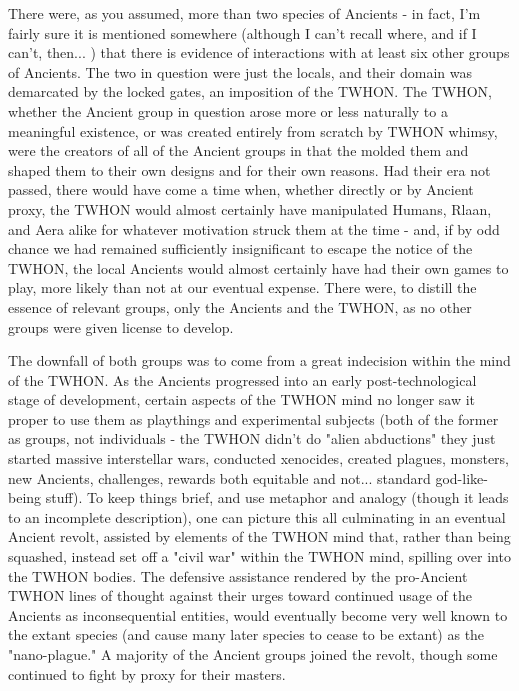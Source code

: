 There were, as you assumed, more than two species of Ancients - in fact, I'm fairly sure it is mentioned somewhere (although I can't recall where, and if I can't, then... ) that there is evidence of interactions with at least six other groups of Ancients. The two in question were just the locals, and their domain was demarcated by the locked gates, an imposition of the TWHON. The TWHON, whether the Ancient group in question arose more or less naturally to a meaningful existence, or was created entirely from scratch by TWHON whimsy, were the creators of all of the Ancient groups in that the molded them and shaped them to their own designs and for their own reasons. Had their era not passed, there would have come a time when, whether directly or by Ancient proxy, the TWHON would almost certainly have manipulated Humans, Rlaan, and Aera alike for whatever motivation struck them at the time - and, if by odd chance we had remained sufficiently insignificant to escape the notice of the TWHON, the local Ancients would almost certainly have had their own games to play, more likely than not at our eventual expense. There were, to distill the essence of relevant groups, only the Ancients and the TWHON, as no other groups were given license to develop.

The downfall of both groups was to come from a great indecision within the mind of the TWHON. As the Ancients progressed into an early post-technological stage of development, certain aspects of the TWHON mind no longer saw it proper to use them as playthings and experimental subjects (both of the former as groups, not individuals - the TWHON didn't do "alien abductions" they just started massive interstellar wars, conducted xenocides, created plagues, monsters, new Ancients, challenges, rewards both equitable and not...  standard god-like-being stuff). To keep things brief, and use metaphor and analogy (though it leads to an incomplete description), one can picture this all culminating in an eventual Ancient revolt, assisted by elements of the TWHON mind that, rather than being squashed, instead set off a "civil war" within the TWHON mind, spilling over into the TWHON bodies. The defensive assistance rendered by the pro-Ancient TWHON lines of thought against their urges toward continued usage of the Ancients as inconsequential entities, would eventually become very well known to the extant species (and cause many later species to cease to be extant) as the "nano-plague." A majority of the Ancient groups joined the revolt, though some continued to fight by proxy for their masters.

